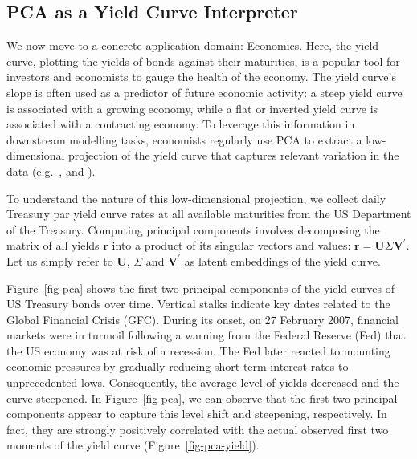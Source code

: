 \documentclass{article}
\theoremstyle{plain}
\theoremstyle{definition}
\theoremstyle{remark}
\begin{document}
\subsection{PCA as a Yield Curve Interpreter}\label{example-principal-component-analysis}

We now move to a concrete application domain: Economics. Here, the yield curve, plotting the yields of bonds against their maturities, is a popular tool for investors and economists to gauge the health of the economy.
The yield curve's slope is often used as a predictor of future economic activity: a steep yield curve is associated with a growing economy, while a flat or inverted yield curve is associated with a contracting economy. %
To leverage this information in downstream modelling tasks, economists regularly use PCA to extract a low-dimensional projection of the yield curve that captures relevant variation in the data (e.g.\ \citet{berardi2022dissecting}, \citet{kumar2022effective} and \citet{crump2019deconstructing}).

To understand the nature of this low-dimensional projection, we collect daily Treasury par yield curve rates at all available maturities from the US Department of the Treasury. Computing principal components involves decomposing the matrix of all yields \(\mathbf{r}\) into a product of its singular vectors and values: \(\mathbf{r}=\mathbf{U}\Sigma\mathbf{V}^{\prime}\). Let us simply refer to \(\mathbf{U}\), \(\Sigma\) and \(\mathbf{V}^{\prime}\) as latent embeddings of the yield curve.

Figure~\ref{fig-pca} shows the first two principal components of the yield curves of US Treasury bonds over time. Vertical stalks indicate key dates related to the Global Financial Crisis (GFC). During its onset, on 27 February 2007, financial markets were in turmoil following a warning from the Federal Reserve (Fed) that the US economy was at risk of a recession. The Fed later reacted to mounting economic pressures by gradually reducing short-term interest rates to unprecedented lows. Consequently, the average level of yields decreased and the curve steepened. In Figure~\ref{fig-pca}, we can observe that the first two principal components appear to capture this level shift and steepening, respectively. In fact, they
are strongly positively correlated with the actual observed first two moments of the yield curve (Figure~\ref{fig-pca-yield}).
\end{document}
